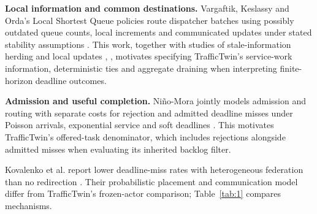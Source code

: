 \documentclass[12pt,a4paper]{article}
\begin{document}
\textbf{Local information and common destinations.} Vargaftik, Keslassy and Orda's Local Shortest Queue policies route dispatcher batches using possibly outdated queue counts, local increments and communicated updates under stated stability assumptions \cite{ref18}. This work, together with studies of stale-information herding and local updates \cite{ref45}, \cite{ref19}, motivates specifying TrafficTwin's service-work information, deterministic ties and aggregate draining when interpreting finite-horizon deadline outcomes.

\textbf{Admission and useful completion.} Niño-Mora jointly models admission and routing with separate costs for rejection and admitted deadline misses under Poisson arrivals, exponential service and soft deadlines \cite{ref20}. This motivates TrafficTwin's offered-task denominator, which includes rejections alongside admitted misses when evaluating its inherited backlog filter.

Kovalenko et al. report lower deadline-miss rates with heterogeneous federation than no redirection \cite{ref46}. Their probabilistic placement and communication model differ from TrafficTwin's frozen-actor comparison; Table~\ref{tab:1} compares mechanisms.
\end{document}
